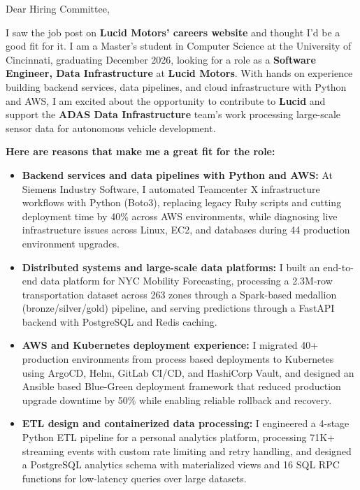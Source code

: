\documentclass[11pt]{letter}
\date{}
\begin{document}
\begin{letter}{}

\opening{Dear Hiring Committee,}

I saw the job post on \textbf{Lucid Motors' careers website} and thought I'd be a good fit for it. I am a Master's student in Computer Science at the University of Cincinnati, graduating December 2026, looking for a role as a \textbf{Software Engineer, Data Infrastructure} at \textbf{Lucid Motors}. With hands on experience building backend services, data pipelines, and cloud infrastructure with Python and AWS, I am excited about the opportunity to contribute to \textbf{Lucid} and support the \textbf{ADAS Data Infrastructure} team's work processing large-scale sensor data for autonomous vehicle development.

\textbf{Here are reasons that make me a great fit for the role:}

\begin{itemize}[leftmargin=*, itemsep=0.45em]
    \item \textbf{Backend services and data pipelines with Python and AWS:} At Siemens Industry Software, I automated Teamcenter X infrastructure workflows with Python (Boto3), replacing legacy Ruby scripts and cutting deployment time by 40\% across AWS environments, while diagnosing live infrastructure issues across Linux, EC2, and databases during 44 production environment upgrades.

    \item \textbf{Distributed systems and large-scale data platforms:} I built an end-to-end data platform for NYC Mobility Forecasting, processing a 2.3M-row transportation dataset across 263 zones through a Spark-based medallion (bronze/silver/gold) pipeline, and serving predictions through a FastAPI backend with PostgreSQL and Redis caching.

    \item \textbf{AWS and Kubernetes deployment experience:} I migrated 40+ production environments from process based deployments to Kubernetes using ArgoCD, Helm, GitLab CI/CD, and HashiCorp Vault, and designed an Ansible based Blue-Green deployment framework that reduced production upgrade downtime by 50\% while enabling reliable rollback and recovery.

    \item \textbf{ETL design and containerized data processing:} I engineered a 4-stage Python ETL pipeline for a personal analytics platform, processing 71K+ streaming events with custom rate limiting and retry handling, and designed a PostgreSQL analytics schema with materialized views and 16 SQL RPC functions for low-latency queries over large datasets.


\end{itemize}
\end{letter}
\end{document}
